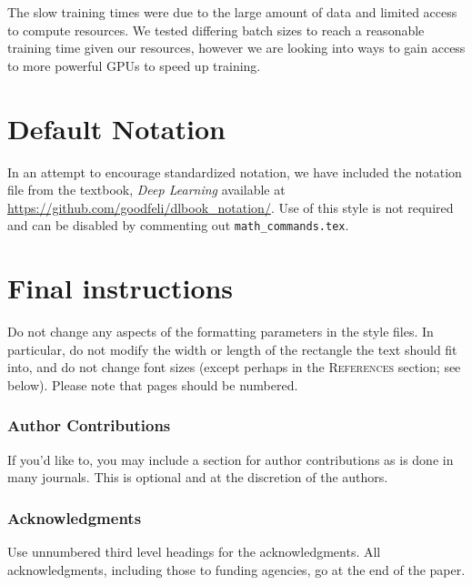 \documentclass{article} %
\begin{document}
The slow training times were due to the large amount of data and limited access to compute resources. We tested differing batch sizes to reach a reasonable training time given our resources, however we are looking into ways to gain access to more powerful GPUs to speed up training.

\section{Default Notation}

In an attempt to encourage standardized notation, we have included the
notation file from the textbook, \textit{Deep Learning}
\cite{goodfellow2016deep} available at
\url{https://github.com/goodfeli/dlbook_notation/}.  Use of this style
is not required and can be disabled by commenting out
\texttt{math\_commands.tex}.



\section{Final instructions}
Do not change any aspects of the formatting parameters in the style files.
In particular, do not modify the width or length of the rectangle the text
should fit into, and do not change font sizes (except perhaps in the
\textsc{References} section; see below). Please note that pages should be
numbered.


\subsubsection*{Author Contributions}
If you'd like to, you may include  a section for author contributions as is done
in many journals. This is optional and at the discretion of the authors.

\subsubsection*{Acknowledgments}
Use unnumbered third level headings for the acknowledgments. All
acknowledgments, including those to funding agencies, go at the end of the paper.

\label{last_page}



\end{document}
